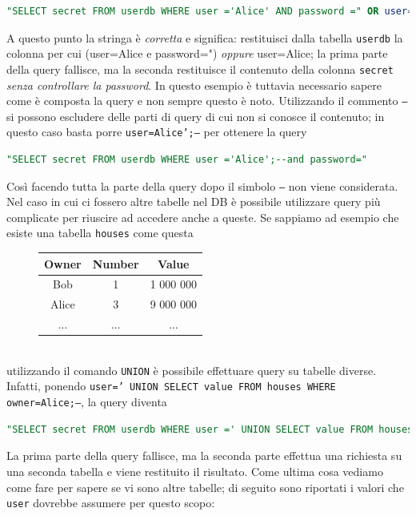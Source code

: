 \begin{lstlisting}[language=sql]
"SELECT secret FROM userdb WHERE user ='Alice' AND password =" OR user='Alice'
\end{lstlisting}
A questo punto la stringa è \textit{corretta} e significa: restituisci dalla tabella \texttt{userdb} la colonna per cui (user=Alice e password=") \textit{oppure} user=Alice; la prima parte della query fallisce, ma la seconda restituisce il contenuto della colonna \texttt{secret} \textit{senza controllare la password}. In questo esempio è tuttavia necessario sapere come è composta la query e non sempre questo è noto. Utilizzando il commento \texttt{--} si possono escludere delle parti di query di cui non si conosce il contenuto; in questo caso basta porre \texttt{user=Alice';--} per ottenere la query
\begin{lstlisting}[language=sql]
"SELECT secret FROM userdb WHERE user ='Alice';--and password="
\end{lstlisting}
Così facendo tutta la parte della query dopo il simbolo \texttt{--} non viene considerata. Nel caso in cui ci fossero altre tabelle nel DB è possibile utilizzare query più complicate per riuscire ad accedere anche a queste. Se sappiamo ad esempio che esiste una tabella \texttt{houses} come questa
\begin{figure}[htbp]
	\centering
	\begin{tabular}{|c|c|c|}
		\hline
		\textbf{Owner} & \textbf{Number} & \textbf{Value} \\
		\hline
		Bob & 1 & 1 000 000 \\
		\hline
		Alice & 3 & 9 000 000 \\
		\hline
		$\dots$ & $\dots$ & $\dots$ \\
		\hline
	\end{tabular}
\end{figure}\\
utilizzando il comando \texttt{UNION} è possibile effettuare query su tabelle diverse. Infatti, ponendo \texttt{user=' UNION SELECT value FROM houses WHERE owner=Alice;--}, la query diventa
\begin{lstlisting}[language=sql,basicstyle=\scriptsize\ttfamily]
"SELECT secret FROM userdb WHERE user =' UNION SELECT value FROM houses WHERE owner=Alice;--"
\end{lstlisting}
La prima parte della query fallisce, ma la seconda parte effettua una richiesta su una seconda tabella e viene restituito il risultato. Come ultima cosa vediamo come fare per sapere se vi sono altre tabelle; di seguito sono riportati i valori che \texttt{user} dovrebbe assumere per questo scopo:
